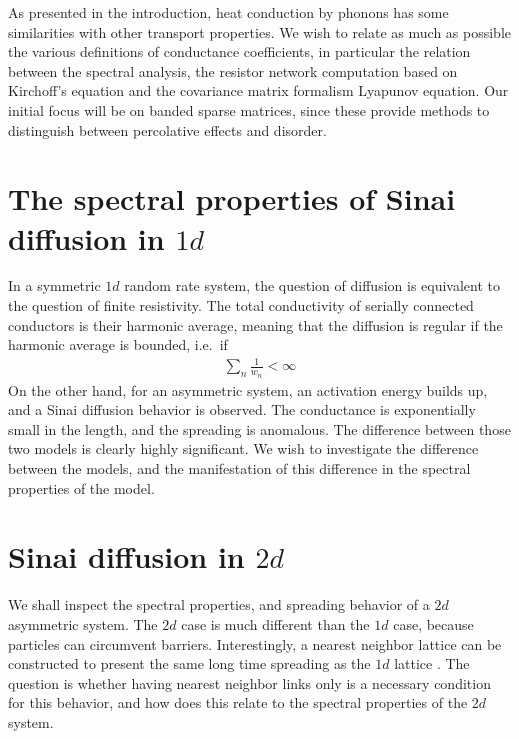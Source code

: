 As presented in the introduction, heat conduction by phonons has some
similarities with other transport properties. We wish to relate as much
as possible the various definitions of conductance coefficients, in 
particular the relation between the spectral analysis,
the resistor network computation based on Kirchoff's equation
and the covariance matrix formalism Lyapunov equation. Our initial focus
will be on banded sparse matrices, since these provide methods to distinguish
between percolative effects and disorder.


\section{The spectral properties of Sinai diffusion in $1d$}

In a symmetric $1d$ random rate system, the question of
diffusion is equivalent to the question of finite resistivity.
The total conductivity of serially connected conductors is their 
harmonic average, meaning that the diffusion is regular
if the harmonic average is bounded, i.e.\ if
%
\begin{align}
 \sum_n \frac{1}{w_n} < \infty 
\end{align}
%
On the other hand, for an asymmetric system, an activation energy 
builds up, and a Sinai diffusion behavior is observed.
The conductance is exponentially small in the length, and the spreading 
is anomalous. The difference between those two models is clearly highly 
significant. We wish to investigate the difference between the models,
and the manifestation of this difference in the spectral properties of the model.

\section{Sinai diffusion in $2d$}






We shall inspect the spectral properties, and spreading behavior of a
$2d$ asymmetric system. The $2d$ case is much different than the $1d$ 
case, because particles can circumvent barriers. Interestingly,
a nearest neighbor lattice can be constructed to present the same 
long time spreading as the $1d$ lattice \cite{blumberg_selinger_diffusion_1989}.
The question is whether having nearest neighbor links only 
is a necessary condition for this behavior,
and how does this relate to the spectral properties of the $2d$ system.



